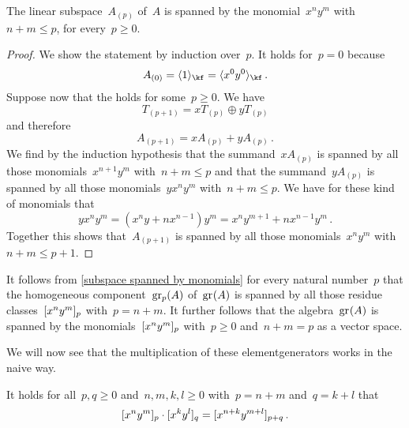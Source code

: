 \begin{lemma}
	\label{subspace spanned by monomials}
	The linear subspace~$A_{(p)}$ of~$A$ is spanned by the monomial~$x^n y^m$ with~$n + m \leq p$, for every~$p \geq 0$.
\end{lemma}
	

\begin{proof}
	We show the statement by induction over~$p$.
	It holds for~$p = 0$ because
	\[
		A_{(0)}
		=
		\gen{1}_{\kf}
		=
		\gen{x^0 y^0}_{\kf} \,.
	\]
	Suppose now that the  holds for some~$p \geq 0$.
	We have
	\[
		T_{(p+1)}
		=
		x T_{(p)} \oplus y T_{(p)}
	\]
	and therefore
	\[
		A_{(p+1)}
		=
		x A_{(p)} + y A_{(p)} \,.
	\]
	We find by the induction hypothesis that the summand~$x A_{(p)}$ is spanned by all those monomials~$x^{n+1} y^m$ with~$n+m \leq p$ and that the summand~$y A_{(p)}$ is spanned by all those monomials~$y x^n y^m$ with~$n + m \leq p$.
	We have for these kind of monomials that
	\[
		y x^n y^m
		=
		(x^n y + n x^{n-1}) y^m
		=
		x^n y^{m+1} + n x^{n-1} y^m \,.
	\]
	Together this shows that~$A_{(p+1)}$ is spanned by all those monomials~$x^n y^m$ with~$n+m \leq p+1$.
\end{proof}
 
\begin{fluff}
	It follows from \cref{subspace spanned by monomials} for every natural number~$p$ that the homogeneous component~$\gr[p](A)$ of~$\gr(A)$ is spanned by all those residue classes~$\lbrack x^n y^m \rbrack_p$ with~$p = n + m$.
	It further follows that the algebra~$\gr(A)$ is spanned by the monomials~$\lbrack x^n y^m \rbrack_p$ with~$p \geq 0$ and~$n + m = p$ as a vector space.

	We will now see that the multiplication of these elementgenerators works in the naive way.
\end{fluff}
	
\begin{lemma}
	\label{generators commute for weyl}
	It holds for all~$p, q \geq 0$ and~$n, m, k, l \geq 0$ with~$p = n+m$ and~$q = k+l$ that
	\[
		\lbrack x^n y^m \rbrack_p \cdot \lbrack x^k y^l \rbrack_q
		=
		\lbrack x^{n+k} y^{m+l} \rbrack_{p+q} \,.
	\]
\end{lemma}
	

